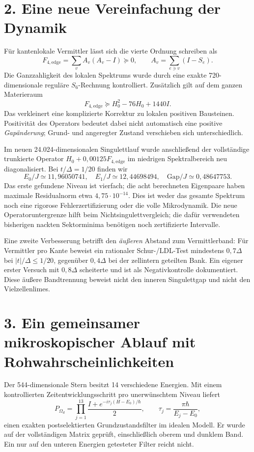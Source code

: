 \section*{2. Eine neue Vereinfachung der Dynamik}
Für kantenlokale Vermittler lässt sich die vierte Ordnung schreiben als
\begin{equation}
F_{4,\mathrm{edge}}=\sum_v A_v(A_v-I)\succeq0,
\qquad A_v=\sum_{e\ni v}(I-S_e).
\end{equation}
Die Ganzzahligkeit des lokalen Spektrums wurde durch eine exakte 720-dimensionale reguläre $S_6$-Rechnung kontrolliert. Zusätzlich gilt auf dem ganzen Materieraum
\begin{equation}
F_{4,\mathrm{edge}}\succeq H_0^2-76H_0+1440I.
\end{equation}
Das verkleinert eine komplizierte Korrektur zu lokalen positiven Bausteinen. Positivität des Operators bedeutet dabei nicht automatisch eine positive \emph{Gapänderung}; Grund- und angeregter Zustand verschieben sich unterschiedlich.

Im neuen 24.024-dimensionalen Singulettlauf wurde anschließend der vollständige trunkierte Operator $H_0+0{,}00125F_{4,\mathrm{edge}}$ im niedrigen Spektralbereich neu diagonalisiert. Bei $t/\Delta=1/20$ finden wir
\begin{equation}
E_0/J\simeq11{,}96050741,\quad E_1/J\simeq12{,}44698494,
\quad\mathrm{Gap}/J\simeq0{,}48647753.
\end{equation}
Das erste gefundene Niveau ist vierfach; die acht berechneten Eigenpaare haben maximale Residualnorm etwa $4{,}75\cdot10^{-14}$. Dies ist weder das gesamte Spektrum noch eine rigorose Fehlerzertifizierung oder die volle Mikrodynamik. Die neue Operatoruntergrenze hilft beim Nichtsingulettvergleich; die dafür verwendeten bisherigen nackten Sektorminima benötigen noch zertifizierte Intervalle.

Eine zweite Verbesserung betrifft den \emph{äußeren} Abstand zum Vermittlerband: Für Vermittler pro Kante beweist ein rationaler Schur-/LDL-Test mindestens $0{,}7\Delta$ bei $|t|/\Delta\le1/20$, gegenüber $0{,}4\Delta$ bei der zellintern geteilten Bank. Ein eigener erster Versuch mit $0{,}8\Delta$ scheiterte und ist als Negativkontrolle dokumentiert. Diese äußere Bandtrennung beweist nicht den inneren Singulettgap und nicht den Vielzellenlimes.

\section*{3. Ein gemeinsamer mikroskopischer Ablauf mit Rohwahrscheinlichkeiten}
Der 544-dimensionale Stern besitzt 14 verschiedene Energien. Mit einem kontrollierten Zeitentwicklungsschritt pro unerwünschtem Niveau liefert
\begin{equation}
P_{\Omega_d}=\prod_{j=1}^{13}
\frac{I+e^{-i\tau_j(H-E_0)/\hbar}}2,
\qquad \tau_j=\frac{\pi\hbar}{E_j-E_0},
\end{equation}
einen exakten postselektierten Grundzustandsfilter im idealen Modell. Er wurde auf der vollständigen Matrix geprüft, einschließlich oberem und dunklem Band. Ein nur auf den unteren Energien getesteter Filter reicht nicht.

